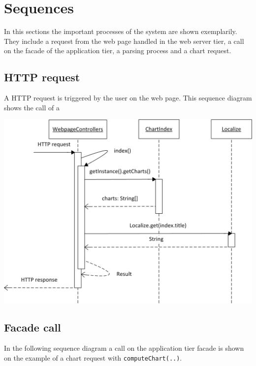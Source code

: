 \section{Sequences}
In this sections the important processes of the system are shown exemplarily. They include a request 
from the web page handled in the web server tier, a call on the facade of the application tier,
a parsing process and a chart request.

\subsection{HTTP request}
A HTTP request is triggered by the user on the web page. This sequence diagram shows
the call of a

\begin{center}
\includegraphics{Pictures/Seq/SeqHTTPRequest.png}
\end{center}


\newpage 
\subsection{Facade call}
In the following sequence diagram a call on the application tier facade is shown 
on the example of a chart request with \texttt{computeChart(..)}.

